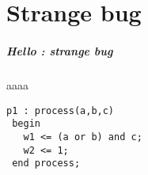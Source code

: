 \documentclass{book}
\begin{document}
\chapter{Strange bug}

\paragraph{Hello : strange bug}
aaaa
\begin{lstlisting}[frame=single]
 p1 : process(a,b,c)
 begin
   w1 <= (a or b) and c;
   w2 <= 1;
 end process;
\end{lstlisting}
\end{document}
